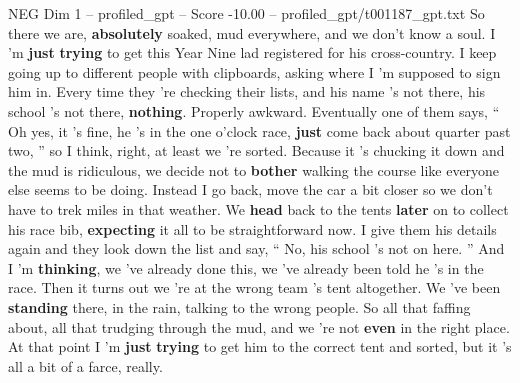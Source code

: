 \begin{textsample}{NEG Dim 1 – profiled\_gpt – Score -10.00 – profiled\_gpt/t001187\_gpt.txt}  \label{ex:f1_neg_003}
So there we are, \textbf{absolutely} soaked, mud everywhere, and we don't know a soul.
I ’m \textbf{just} \textbf{trying} to get this Year Nine lad registered for his cross-country.
I keep going up to different people with clipboards, asking where I ’m supposed to sign him in.
Every time they ’re checking their lists, and his name ’s not there, his school ’s not there, \textbf{nothing}.
Properly awkward.
Eventually one of them says, “ Oh yes, it ’s fine, he ’s in the one o’clock race, \textbf{just} come back about quarter past two, ” so I think, right, at least we ’re sorted.
Because it ’s chucking it down and the mud is ridiculous, we decide not to \textbf{bother} walking the course like everyone else seems to be doing.
Instead I go back, move the car a bit closer so we don't have to trek miles in that weather.
We \textbf{head} back to the tents \textbf{later} on to collect his race bib, \textbf{expecting} it all to be straightforward now.
I give them his details again and they look down the list and say, “ No, his school ’s not on here. ” And I ’m \textbf{thinking}, we ’ve already done this, we ’ve already been told he ’s in the race.
Then it turns out we ’re at the wrong team ’s tent altogether.
We ’ve been \textbf{standing} there, in the rain, talking to the wrong people.
So all that faffing about, all that trudging through the mud, and we ’re not \textbf{even} in the right place.
At that point I ’m \textbf{just} \textbf{trying} to get him to the correct tent and sorted, but it ’s all a bit of a farce, really.

\end{textsample}
